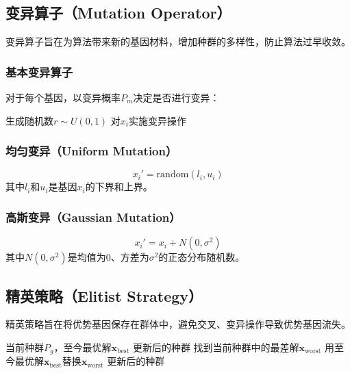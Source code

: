 \subsection{变异算子（Mutation Operator）}

变异算子旨在为算法带来新的基因材料，增加种群的多样性，防止算法过早收敛。

\subsubsection{基本变异算子}

对于每个基因，以变异概率$P_m$决定是否进行变异：

\begin{algorithm}[H]
\caption{基本变异操作}
\begin{algorithmic}[1]
        \STATE 生成随机数$r \sim U(0,1)$
            \STATE 对$x_i$实施变异操作
        \ENDIF
    \ENDFOR
\ENDFOR
\end{algorithmic}
\end{algorithm}

\subsubsection{均匀变异（Uniform Mutation）}
\[
x_i' = \text{random}(l_i, u_i)
\]
其中$l_i$和$u_i$是基因$x_i$的下界和上界。

\subsubsection{高斯变异（Gaussian Mutation）}
\[
x_i' = x_i + N(0, \sigma^2)
\]
其中$N(0, \sigma^2)$是均值为0、方差为$\sigma^2$的正态分布随机数。

\subsection{精英策略（Elitist Strategy）}

精英策略旨在将优势基因保存在群体中，避免交叉、变异操作导致优势基因流失。

\begin{algorithm}[H]
\caption{精英策略}
\begin{algorithmic}[1]
\REQUIRE 当前种群$P_g$，至今最优解$\mathbf{x}_{\text{best}}$
\ENSURE 更新后的种群
\STATE 找到当前种群中的最差解$\mathbf{x}_{\text{worst}}$
\STATE 用至今最优解$\mathbf{x}_{\text{best}}$替换$\mathbf{x}_{\text{worst}}$
\RETURN 更新后的种群
\end{algorithmic}
\end{algorithm}

